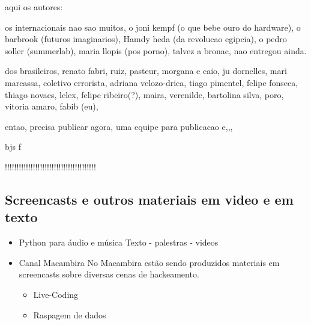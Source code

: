 \begin{itemize}
aqui os autores:

os internacionais nao sao muitos, o joni kempf (o que bebe ouro do hardware), o barbrook (futuros imaginarios),
Hamdy heda (da revolucao egipcia), o pedro soller (summerlab), maria llopis (pos porno),  talvez a bronac, nao entregou ainda.

dos brasileiros, renato fabri, ruiz, pasteur, morgana e caio, ju dornelles, mari marcassa, coletivo errorista, adriana velozo-drica, tiago pimentel, felipe fonseca, thiago novaes, lelex, felipe ribeiro(?), maira, verenilde,  bartolina silva, poro, vitoria amaro, fabib (eu),

entao, precisa publicar agora,
uma equipe para publicacao e,,, 

bjs
f

!!!!!!!!!!!!!!!!!!!!!!!!!!!!!!!!!!!!!!!

\end{itemize}

\subsection{Screencasts e outros materiais em video e em texto}

\begin{itemize}
    \item Python para áudio e música
	  Texto - palestras - videos

    \item Canal Macambira
No Macambira estão sendo produzidos materiais em screencasts sobre
diversas cenas de hackeamento.

    \begin{itemize}
	\item Live-Coding
	\item Raspagem de dados
    \end{itemize}
\end{itemize}
